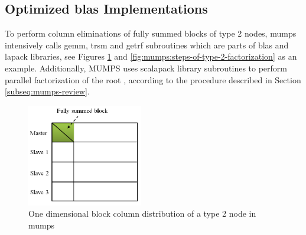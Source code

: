 \subsection{Optimized \acrshort{blas} Implementations}
\label{subseq:blas-comparison}


To perform column eliminations of fully summed blocks of type 2 nodes, \acrshort{mumps} intensively calls \acrshort{gemm}, \acrshort{trsm} and \acrshort{getrf} subroutines  \cite{l2013introduction} which are parts of \acrshort{blas} and \acrshort{lapack} libraries, see Figures \ref{fig:mumps:type-2-frontal-matrix} and  \ref{fig:mumps:steps-of-type-2-factorization} as an example. Additionally, MUMPS uses \acrshort{scalapack} library subroutines to perform parallel factorization of the root \cite{mumps-manual}, according to the procedure described in Section \ref{subseq:mumps-review}. \\


\figpointer{\ref{fig:mumps:type-2-frontal-matrix}}
\begin{figure}[htpb]
  \centering
  \includegraphics[width=0.45\textwidth]{figures/chapter-2/mumps-type-2-frontal-matrix.png}
\caption{One dimensional block column distribution of a type 2 node in \acrshort{mumps}}
\label{fig:mumps:type-2-frontal-matrix}
\end{figure}


